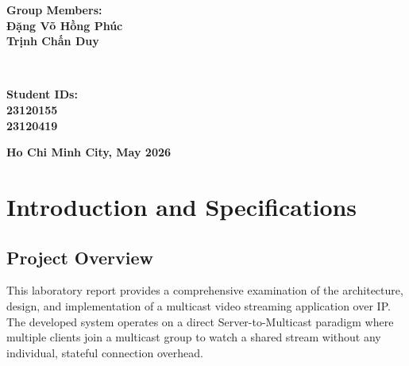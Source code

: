 \documentclass[12pt,a4paper]{report}
\makeatletter
\renewcommand\tableofcontents{%
    \begin{center}
      {\Large\bfseries \contentsname}
      \par\nobreak
      \vspace{10pt}
    \end{center}
    \@starttoc{toc}
}
\makeatother
\begin{document}
\begin{titlepage}
\begin{center}
\begin{minipage}{0.4\textwidth}
\begin{flushleft}\large
\textbf{Group Members:}\\
\textbf{Đặng Võ Hồng Phúc}\\
\textbf{Trịnh Chấn Duy}
\end{flushleft}
\end{minipage}
~
\begin{minipage}{0.4\textwidth}
\begin{flushright}\large
\textbf{Student IDs:}\\
\textbf{23120155}\\
\textbf{23120419}
\end{flushright}
\end{minipage}

\vfill
{\bf Ho Chi Minh City, May 2026}

\end{center}
\end{titlepage}

\tableofcontents
\newpage
{}

\chapter{Introduction and Specifications}

\section{Project Overview}
This laboratory report provides a comprehensive examination of the architecture, design, and implementation of a multicast video streaming application over IP. The developed system operates on a direct Server-to-Multicast paradigm where multiple clients join a multicast group to watch a shared stream without any individual, stateful connection overhead.
\end{document}
